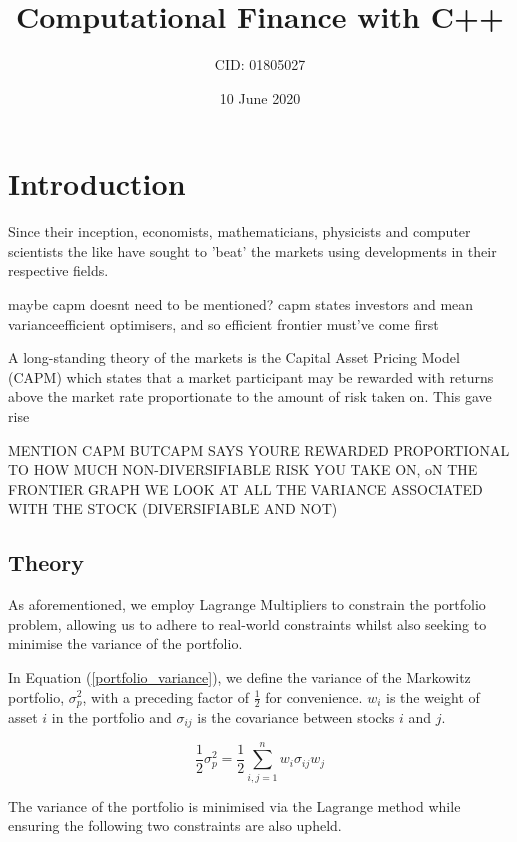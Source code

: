 \documentclass{article}
\title{Computational Finance with C++}
\author{CID: 01805027}
\date{10 June 2020}
\begin{document}
\renewcommand*{\arraystretch}{1.5}

\maketitle
\section{Introduction} 
\label{sec:introduction}

Since their inception, economists, mathematicians, physicists and computer scientists the like have sought to 'beat' the markets using developments in their respective fields.


maybe capm doesnt need to be mentioned? capm states investors and mean varianceefficient optimisers, and so efficient frontier must've come first

A long-standing theory of the markets is the Capital Asset Pricing Model (CAPM) which states that a market participant may be rewarded with returns above the market rate proportionate to the amount of risk taken on. This gave rise 



MENTION CAPM BUTCAPM SAYS YOURE REWARDED PROPORTIONAL TO HOW MUCH NON-DIVERSIFIABLE RISK YOU TAKE ON, oN THE FRONTIER GRAPH WE LOOK AT ALL THE VARIANCE ASSOCIATED WITH THE STOCK (DIVERSIFIABLE AND NOT)



\subsection{Theory}
\label{sec:theory}

As aforementioned, we employ Lagrange Multipliers to constrain the portfolio problem, allowing us to adhere to real-world constraints whilst also seeking to minimise the variance of the portfolio.

In Equation (\ref{portfolio_variance}), we define the variance of the Markowitz portfolio, $\sigma_{p}^{2}$, with a preceding factor of $\frac{1}{2}$ for convenience. $w_i$ is the weight of asset $i$ in the portfolio and $\sigma_{ij}$ is the covariance between stocks $i$ and $j$.

\begin{equation}
\dfrac{1}{2} \sigma^{2}_{p} =  \dfrac{1}{2} \sum_{i,j=1}^{n} w_{i} \sigma_{ij} w_{j}
\label{portfolio_variance}
\end{equation}

The variance of the portfolio is minimised via the Lagrange method while ensuring the following two constraints are also upheld. 
\end{document}
